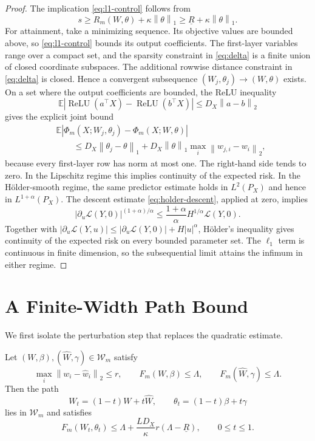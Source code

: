 \documentclass[smallextended,envcountsect]{svjour3}
\newcommand{\relu}{\operatorname{ReLU}}
\newcommand{\E}{\mathbb{E}}
\newcommand{\norm}[1]{\left\lVert #1 \right\rVert}
\newcommand{\abs}[1]{\left\lvert #1 \right\rvert}
\begin{document}
\begin{proof}
The implication \eqref{eq:l1-control} follows from
\[
s\ge R_m(W,\theta)+\kappa\norm{\theta}_1
\ge\underline R+\kappa\norm{\theta}_1.
\]
For attainment, take a minimizing sequence. Its objective values are bounded above, so \eqref{eq:l1-control} bounds its output coefficients. The first-layer variables range over a compact set, and the sparsity constraint in \eqref{eq:delta} is a finite union of closed coordinate subspaces. The additional rowwise distance constraint in \eqref{eq:delta} is closed. Hence a convergent subsequence $(W_j,\theta_j)\to(W,\theta)$ exists. On a set where the output coefficients are bounded, the ReLU inequality
\[
\E\abs{\relu(a^\top X)-\relu(b^\top X)}
\le D_X\norm{a-b}_2
\label{eq:relu-lipschitz}
\]
gives the explicit joint bound
\[
\begin{aligned}
&\E\abs{\Phi_m(X;W_j,\theta_j)-\Phi_m(X;W,\theta)}\\
&\qquad\le D_X\norm{\theta_j-\theta}_1
   +D_X\norm{\theta}_1\max_i\norm{w_{j,i}-w_i}_2,
\end{aligned}
\]
because every first-layer row has norm at most one. The right-hand side tends to zero. In the Lipschitz regime this implies continuity of the expected risk.
In the H\"older-smooth regime, the same predictor estimate holds in $L^2(P_X)$ and hence in $L^{1+\alpha}(P_X)$. The descent estimate \eqref{eq:holder-descent}, applied at zero, implies
\[
 \abs{\partial_u\mathcal L(Y,0)}^{(1+\alpha)/\alpha}
 \le \frac{1+\alpha}{\alpha}H^{1/\alpha}\mathcal L(Y,0).
\]
Together with
$\abs{\partial_u\mathcal L(Y,u)}\le
\abs{\partial_u\mathcal L(Y,0)}+H\abs u^\alpha$,
H\"older's inequality gives continuity of the expected risk on every bounded parameter set. The $\ell_1$ term is continuous in finite dimension, so the subsequential limit attains the infimum in either regime.
\end{proof}

\section{A Finite-Width Path Bound}\label{sec:finite}

We first isolate the perturbation step that replaces the quadratic estimate.

\begin{lemma}\label{lem:bridge}
Let $(W,\beta),(\widehat W,\gamma)\in\mathcal W_m$ satisfy
\[
\max_i\norm{w_i-\hat w_i}_2\le r,
\qquad
F_m(W,\beta)\le\Lambda,
\qquad
F_m(\widehat W,\gamma)\le\Lambda.
\]
Then the path
\[
W_t=(1-t)W+t\widehat W,
\qquad
\theta_t=(1-t)\beta+t\gamma
\]
lies in $\mathcal W_m$ and satisfies
\begin{equation}
F_m(W_t,\theta_t)
\le
\Lambda+\frac{LD_X}{\kappa}r(\Lambda-\underline R),
\qquad 0\le t\le1.
\label{eq:bridge-bound}
\end{equation}
\end{lemma}
\end{document}
